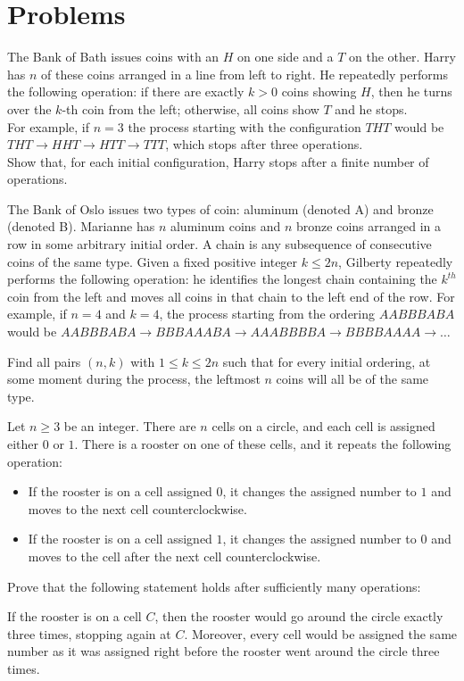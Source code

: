 \section{Problems}

\begin{problem}[IMO 2019]
   The Bank of Bath issues coins with an $H$ on one side and a $T$ on the other. Harry has $n$ of these coins arranged in a line from left to right. He repeatedly performs the following operation: if there are exactly $k>0$ coins showing $H$, then he turns over the $k$-th coin from the left; otherwise, all coins show $T$ and he stops. \\ For example, if $n=3$ the process starting with the configuration $THT$ would be $THT \to HHT \to HTT \to TTT$, which stops after three operations. \\ Show that, for each initial configuration, Harry stops after a finite number of operations.
\end{problem}

\begin{problem}[IMO 2022]
    The Bank of Oslo issues two types of coin: aluminum (denoted A) and bronze (denoted B). Marianne has $n$ aluminum coins and $n$ bronze coins arranged in a row in some arbitrary initial order. A chain is any subsequence of consecutive coins of the same type. Given a fixed positive integer $k \leq 2n$, Gilberty repeatedly performs the following operation: he identifies the longest chain containing the $k^{th}$ coin from the left and moves all coins in that chain to the left end of the row. For example, if $n=4$ and $k=4$, the process starting from the ordering $AABBBABA$ would be $AABBBABA \to BBBAAABA \to AAABBBBA \to BBBBAAAA \to \dots$

    Find all pairs $(n,k)$ with $1 \leq k \leq 2n$ such that for every initial ordering, at some moment during the process, the leftmost $n$ coins will all be of the same type.
\end{problem}

\begin{problem}[APMO 2025]
    Let $n \geq 3$ be an integer. There are $n$ cells on a circle, and each cell is assigned either $0$ or $1$. There is a rooster on one of these cells, and it repeats the following operation:
    
    \begin{itemize}
        \item If the rooster is on a cell assigned $0$, it changes the assigned number to $1$ and moves to the next cell counterclockwise.
        \item If the rooster is on a cell assigned $1$, it changes the assigned number to $0$ and moves to the cell after the next cell counterclockwise.
    \end{itemize}

    Prove that the following statement holds after sufficiently many operations:

    If the rooster is on a cell $C$, then the rooster would go around the circle exactly three times, stopping again at $C$. Moreover, every cell would be assigned the same number as it was assigned right before the rooster went around the circle three times.
\end{problem}

